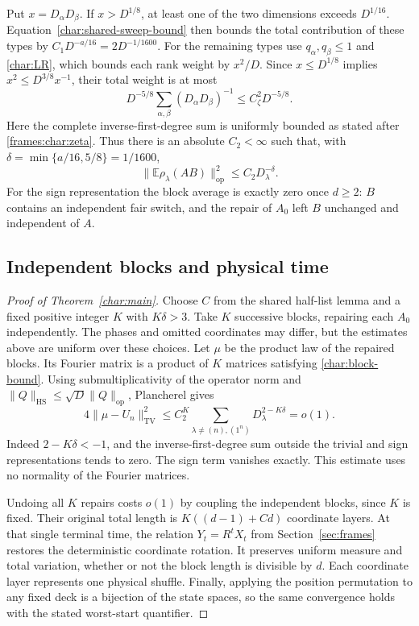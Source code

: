 Put $x=D_\alpha D_\beta$. If $x>D^{1/8}$, at least one of the two
dimensions exceeds $D^{1/16}$. Equation~\eqref{char:shared-sweep-bound}
then bounds the total contribution of these types by
$C_1D^{-a/16}=2D^{-1/1600}$. For the remaining types use
$q_\alpha,q_\beta\le1$ and \eqref{char:LR}, which bounds each
rank weight by $x^2/D$. Since $x\le D^{1/8}$ implies
$x^2\le D^{3/8}x^{-1}$, their total weight is at most
\[
 D^{-5/8}\sum_{\alpha,\beta}(D_\alpha D_\beta)^{-1}
 \le C_\zeta^2D^{-5/8}.
\]
Here the complete inverse-first-degree sum is uniformly bounded as
stated after \eqref{frames:char:zeta}. Thus there is an absolute
$C_2<\infty$ such that, with
$\delta=\min\{a/16,5/8\}=1/1600$,
\begin{equation}\label{char:block-bound}
 \|\mathbb E\rho_\lambda(AB)\|_{\mathrm{op}}^2
 \le C_2D_\lambda^{-\delta}.
\end{equation}
For the sign representation the block average is exactly zero once
$d\ge2$: $B$ contains an independent fair switch, and the repair of
$A_0$ left $B$ unchanged and independent of $A$.

\subsection{Independent blocks and physical time}
\label{char:completion}

\begin{proof}[Proof of Theorem~\ref{char:main}]
Choose $C$ from the shared half-list lemma and a fixed positive integer
$K$ with $K\delta>3$. Take $K$ successive blocks, repairing each
$A_0$ independently. The phases and omitted coordinates may differ,
but the estimates above are uniform over these choices. Let $\mu$ be
the product law of the repaired blocks. Its Fourier matrix is a product
of $K$ matrices satisfying \eqref{char:block-bound}. Using
submultiplicativity of the operator norm and
$\|Q\|_{\mathrm{HS}}\le\sqrt D\|Q\|_{\mathrm{op}}$, Plancherel gives
\[
 4\|\mu-U_n\|_{\mathrm{TV}}^2
 \le C_2^K\sum_{\lambda\ne(n),(1^n)}D_\lambda^{2-K\delta}
 =o(1).
\]
Indeed $2-K\delta<-1$, and the inverse-first-degree sum outside the
trivial and sign representations tends to zero. The sign term vanishes
exactly. This estimate uses no normality of the Fourier matrices.

Undoing all $K$ repairs costs $o(1)$ by coupling the independent blocks,
since $K$ is fixed. Their original total length is
$K((d-1)+Cd)$ coordinate layers. At that single terminal time, the
relation $Y_t=R^tX_t$ from Section~\ref{sec:frames} restores the
deterministic coordinate rotation.
It preserves uniform measure and total variation, whether or not the
block length is divisible by $d$. Each coordinate layer represents one
physical shuffle. Finally, applying the position permutation to any
fixed deck is a bijection of the state spaces, so the same convergence
holds with the stated worst-start quantifier.
\end{proof}
